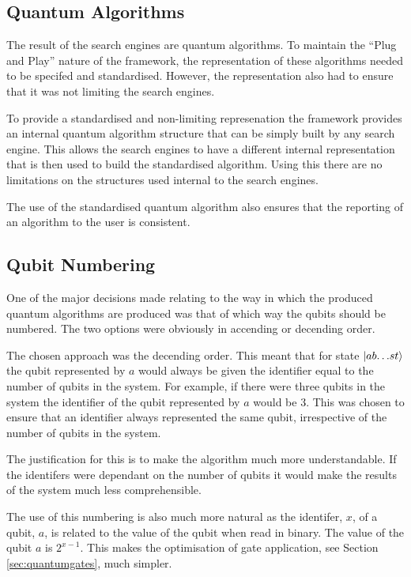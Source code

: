 \documentclass[authoryearcitations]{UoYCSproject}
\begin{document}
\subsection{Quantum Algorithms}
The result of the search engines are quantum algorithms.
To maintain the ``Plug and Play'' nature of the framework, the representation of these algorithms needed to be specifed and standardised.
However, the representation also had to ensure that it was not limiting the search engines.

To provide a standardised and non-limiting represenation the framework provides an internal quantum algorithm structure that can be simply built by any search engine.
This allows the search engines to have a different internal representation that is then used to build the standardised algorithm.
Using this there are no limitations on the structures used internal to the search engines.

The use of the standardised quantum algorithm also ensures that the reporting of an algorithm to the user is consistent.

\subsection{Qubit Numbering}
One of the major decisions made relating to the way in which the produced quantum algorithms are produced was that of which way the qubits should be numbered.
The two options were obviously in accending or decending order.

The chosen approach was the decending order.
This meant that for state $\left\vert{ab{\dots}st}\right\rangle$ the qubit represented by $a$ would always be given the identifier equal to the number of qubits in the system.
For example, if there were three qubits in the system the identifier of the qubit represented by $a$ would be $3$.
This was chosen to ensure that an identifier always represented the same qubit, irrespective of the number of qubits in the system.

The justification for this is to make the algorithm much more understandable.
If the identifers were dependant on the number of qubits it would make the results of the system much less comprehensible.

The use of this numbering is also much more natural as the identifer, $x$, of a qubit, $a$, is related to the value of the qubit when read in binary.
The value of the qubit $a$ is $2^{x-1}$.
This makes the optimisation of gate application, see Section \ref{sec:quantumgates}, much simpler.
\end{document}
